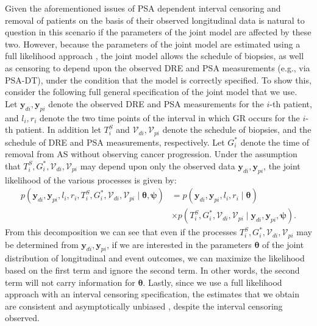 Given the aforementioned issues of PSA dependent interval censoring and removal of patients on the basis of their observed longitudinal data is natural to question in this scenario if the parameters of the joint model are affected by these two. However, because the parameters of the joint model are estimated using a full likelihood approach \citep{tsiatis2004joint}, the joint model allows the schedule of biopsies, as well as censoring to depend upon the observed DRE and PSA measurements (e.g., via PSA-DT), under the condition that the model is correctly specified. To show this, consider the following full general specification of the joint model that we use. Let $\boldsymbol{y}_{di}, \boldsymbol{y}_{pi}$ denote the observed DRE and PSA measurements for the $i$-th patient, and $l_i, r_i$ denote the two time points of the interval in which GR occurs for the $i$-th patient. In addition let $T_i^S$ and $\mathcal{V}_{di}, \mathcal{V}_{pi}$ denote the schedule of biopsies, and the schedule of DRE and PSA measurements, respectively. Let $G^*_i$ denote the time of removal from AS without observing cancer progression. Under the assumption that $T_i^S, G^*_i, \mathcal{V}_{di}, \mathcal{V}_{pi}$ may depend upon only the observed data $\boldsymbol{y}_{di}, \boldsymbol{y}_{pi}$, the joint likelihood of the various processes is given by:
\begin{align*}
p(\boldsymbol{y}_{di}, \boldsymbol{y}_{pi}, l_i, r_i, T_i^S, G^*_i, \mathcal{V}_{di}, \mathcal{V}_{pi} \mid \boldsymbol{\theta}, \boldsymbol{\psi}) &= p(\boldsymbol{y}_{di}, \boldsymbol{y}_{pi}, l_i, r_i \mid \boldsymbol{\theta}) \\ & \times p(T_i^S, G^*_i, \mathcal{V}_{di}, \mathcal{V}_{pi} \mid \boldsymbol{y}_{di}, \boldsymbol{y}_{pi}, \boldsymbol{\psi}).
\end{align*}
From this decomposition we can see that even if the processes $T_i^S, G^*_i, \mathcal{V}_{di}, \mathcal{V}_{pi}$ may be determined from $\boldsymbol{y}_{di}, \boldsymbol{y}_{pi}$, if we are interested in the parameters $\boldsymbol{\theta}$ of the joint distribution of longitudinal and event outcomes, we can maximize the likelihood based on the first term and ignore the second term. In other words, the second term will not carry information for $\boldsymbol{\theta}$. Lastly, since we use a full likelihood approach with an interval censoring specification, the estimates that we obtain are consistent and asymptotically unbiased \citep{gentleman1994maximum}, despite the interval censoring observed. 